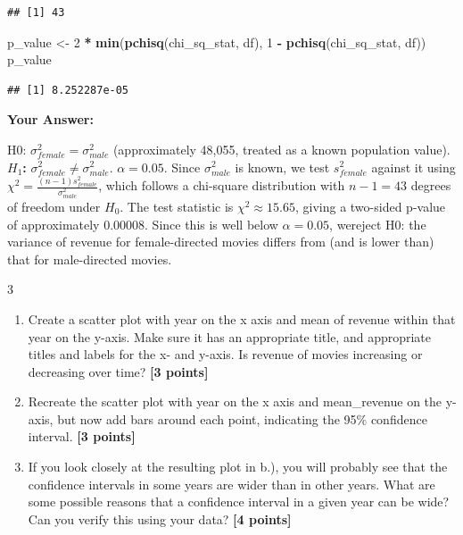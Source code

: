 \documentclass[
]{article}
\newenvironment{Shaded}{\begin{snugshade}}{\end{snugshade}}
\newcommand{\DecValTok}[1]{\textcolor[rgb]{0.00,0.00,0.81}{#1}}
\newcommand{\FunctionTok}[1]{\textcolor[rgb]{0.13,0.29,0.53}{\textbf{#1}}}
\newcommand{\NormalTok}[1]{#1}
\newcommand{\OtherTok}[1]{\textcolor[rgb]{0.56,0.35,0.01}{#1}}
\newcommand{\SpecialCharTok}[1]{\textcolor[rgb]{0.81,0.36,0.00}{\textbf{#1}}}
\providecommand{\tightlist}{%
  \setlength{\itemsep}{0pt}\setlength{\parskip}{0pt}}
\begin{document}
\begin{verbatim}
## [1] 43
\end{verbatim}

\begin{Shaded}
\begin{Highlighting}[]
\NormalTok{p\_value }\OtherTok{\textless{}{-}} \DecValTok{2} \SpecialCharTok{*} \FunctionTok{min}\NormalTok{(}\FunctionTok{pchisq}\NormalTok{(chi\_sq\_stat, df), }\DecValTok{1} \SpecialCharTok{{-}} \FunctionTok{pchisq}\NormalTok{(chi\_sq\_stat, df))}
\NormalTok{p\_value}
\end{Highlighting}
\end{Shaded}

\begin{verbatim}
## [1] 8.252287e-05
\end{verbatim}

\textbf{Your Answer:}

H0: \(\sigma^2_{female} = \sigma^2_{male}\) (approximately 48,055,
treated as a known population value). \textbf{\(H_1\):}
\(\sigma^2_{female} \neq \sigma^2_{male}\). \(\alpha = 0.05\). Since
\(\sigma^2_{male}\) is known, we test \(s^2_{female}\) against it using
\(\chi^2 = \frac{(n-1)s^2_{female}}{\sigma^2_{male}}\), which follows a
chi-square distribution with \(n-1 = 43\) degrees of freedom under
\(H_0\). The test statistic is \(\chi^2 \approx 15.65\), giving a
two-sided p-value of approximately 0.00008. Since this is well below
\(\alpha = 0.05\), wereject H0: the variance of revenue for
female-directed movies differs from (and is lower than) that for
male-directed movies.

3

\begin{enumerate}
\def\labelenumi{\alph{enumi}.}
\tightlist
\item
  Create a scatter plot with year on the x axis and mean of revenue
  within that year on the y-axis. Make sure it has an appropriate title,
  and appropriate titles and labels for the x- and y-axis. Is revenue of
  movies increasing or decreasing over time? \textbf{[3 points]}
\item
  Recreate the scatter plot with year on the x axis and mean\_revenue on
  the y-axis, but now add bars around each point, indicating the 95\%
  confidence interval. \textbf{[3 points]}
\item
  If you look closely at the resulting plot in b.), you will probably
  see that the confidence intervals in some years are wider than in
  other years. What are some possible reasons that a confidence interval
  in a given year can be wide? Can you verify this using your data?
  \textbf{[4 points]}
\end{enumerate}
\end{document}
